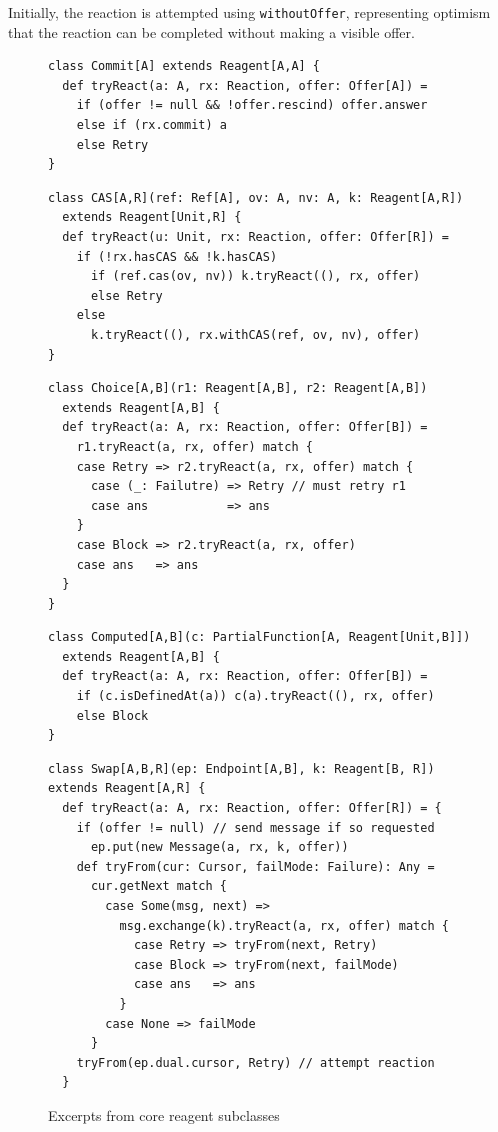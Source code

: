 \documentclass[preprint,nocopyrightspace]{sigplanconf}
\begin{document}
Initially, the reaction is attempted using \lstinline{withoutOffer},
representing optimism that the reaction can be completed without making a
visible offer.

\begin{figure}[t]
\begin{lstlisting}[frame=single]
class Commit[A] extends Reagent[A,A] {
  def tryReact(a: A, rx: Reaction, offer: Offer[A]) = 
    if (offer != null && !offer.rescind) offer.answer
    else if (rx.commit) a 
    else Retry
}
\end{lstlisting}
\vskip -21pt
\begin{lstlisting}[frame=single]
class CAS[A,R](ref: Ref[A], ov: A, nv: A, k: Reagent[A,R]) 
  extends Reagent[Unit,R] {
  def tryReact(u: Unit, rx: Reaction, offer: Offer[R]) = 
    if (!rx.hasCAS && !k.hasCAS)
      if (ref.cas(ov, nv)) k.tryReact((), rx, offer)
      else Retry
    else
      k.tryReact((), rx.withCAS(ref, ov, nv), offer)
}
\end{lstlisting}
\vskip -21pt
\begin{lstlisting}[frame=single]
class Choice[A,B](r1: Reagent[A,B], r2: Reagent[A,B]) 
  extends Reagent[A,B] {
  def tryReact(a: A, rx: Reaction, offer: Offer[B]) = 
    r1.tryReact(a, rx, offer) match {
    case Retry => r2.tryReact(a, rx, offer) match {
      case (_: Failutre) => Retry // must retry r1
      case ans           => ans
    }
    case Block => r2.tryReact(a, rx, offer)
    case ans   => ans
  }
}
\end{lstlisting}
\vskip -21pt
\begin{lstlisting}[frame=single]
class Computed[A,B](c: PartialFunction[A, Reagent[Unit,B]]) 
  extends Reagent[A,B] {
  def tryReact(a: A, rx: Reaction, offer: Offer[B]) = 
    if (c.isDefinedAt(a)) c(a).tryReact((), rx, offer)
    else Block
}
\end{lstlisting}
\vskip -21pt
\begin{lstlisting}[frame=single]
class Swap[A,B,R](ep: Endpoint[A,B], k: Reagent[B, R]) 
extends Reagent[A,R] {
  def tryReact(a: A, rx: Reaction, offer: Offer[R]) = {
    if (offer != null) // send message if so requested
      ep.put(new Message(a, rx, k, offer))
    def tryFrom(cur: Cursor, failMode: Failure): Any = 
      cur.getNext match {
        case Some(msg, next) =>
          msg.exchange(k).tryReact(a, rx, offer) match {
            case Retry => tryFrom(next, Retry)
            case Block => tryFrom(next, failMode)
            case ans   => ans
          }
        case None => failMode
      }    
    tryFrom(ep.dual.cursor, Retry) // attempt reaction
  }
\end{lstlisting}
\nocaptionrule
\caption{Excerpts from core reagent subclasses}
\label{fig:impl}
\end{figure}
\end{document}

